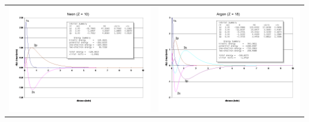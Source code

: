 \documentclass[11pt]{article}
\begin{document}
\begin{table}
\begin{tabular}{cc}
\includegraphics[scale=0.33]{Images/Slide3.png} & \includegraphics[scale=0.33]{Images/Slide4.png} \\

\end{tabular}
\end{table}
\end{document}
